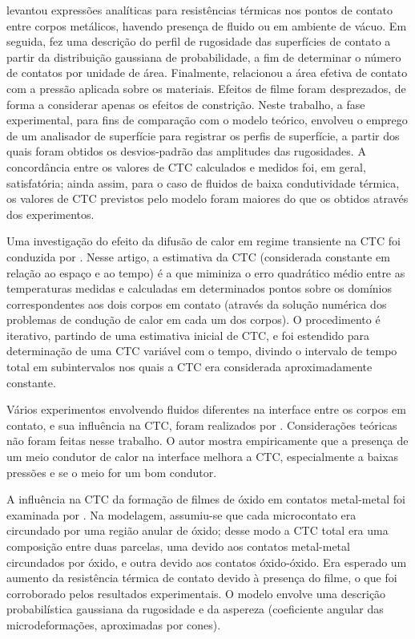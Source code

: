 \cite{tese_mikic} levantou expressões analíticas para resistências térmicas nos pontos de contato entre corpos metálicos, havendo presença de
fluido ou em ambiente de vácuo. Em seguida, fez uma descrição do perfil de rugosidade das superfícies de contato
a partir da distribuição gaussiana de probabilidade, a fim de determinar o número de contatos por unidade de área. Finalmente, relacionou a área efetiva de 
contato com a pressão aplicada sobre os materiais. Efeitos de filme foram desprezados, de forma a considerar apenas os efeitos de constrição.
Neste trabalho, a fase experimental, para fins de comparação com o modelo teórico, envolveu o emprego de um analisador de superfície para registrar os perfis de superfície, a partir dos quais foram obtidos
os desvios-padrão das amplitudes das rugosidades. A concordância entre os valores de CTC calculados e medidos foi, em geral, satisfatória; ainda assim,
para o caso de fluidos de baixa condutividade térmica, os valores de CTC previstos pelo modelo foram maiores do que os obtidos através dos experimentos. 

Uma investigação do efeito da difusão de calor em regime transiente na CTC foi conduzida por \cite{artigo_beck}. Nesse artigo, a estimativa da CTC (considerada constante em relação ao espaço e ao tempo) é a que miminiza o erro quadrático médio entre as temperaturas medidas e calculadas em determinados pontos sobre os domínios correspondentes aos dois corpos em contato (através da solução numérica dos problemas de condução de calor em cada um dos corpos). O procedimento é iterativo, partindo de uma estimativa inicial de CTC, e foi estendido para determinação de uma CTC variável com o tempo, divindo o intervalo de tempo total em subintervalos nos quais a CTC era considerada aproximadamente constante.

Vários experimentos envolvendo fluidos diferentes na interface entre os corpos em contato, e sua influência na CTC, foram realizados por \cite{artigo_madhusudana}.
Considerações teóricas não foram feitas nesse trabalho. O autor mostra empiricamente que a presença de um meio condutor de calor na interface melhora a CTC,
especialmente a baixas pressões e se o meio for um bom condutor.   

A influência na CTC da formação de filmes de óxido em contatos metal-metal foi examinada por \cite{artigo_astrabadi}. Na modelagem, assumiu-se
que cada microcontato era circundado por uma região anular de óxido; desse modo a CTC total era uma composição entre duas parcelas, uma devido
aos contatos metal-metal circundados por óxido, e outra devido aos contatos óxido-óxido. Era esperado um aumento da resistência térmica de contato
devido à presença do filme, o que foi corroborado pelos resultados experimentais. O modelo envolve uma descrição probabilística gaussiana da rugosidade e
da aspereza (coeficiente angular das microdeformações, aproximadas por cones).

